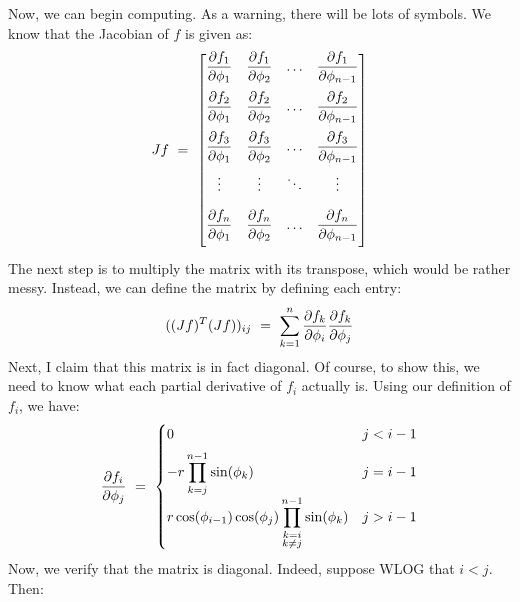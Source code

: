 Now, we can begin computing. As a warning, there will be lots of symbols.
We know that the Jacobian of $ f $ is given as:
\begin{equation*}
    Jf \ = \
    \begin{bmatrix}
        \dfrac{\partial f_{1}}{\partial \phi_{1}} & \dfrac{\partial f_{1}}{\partial \phi_{2}} & \dots &
        \dfrac{\partial f_{1}}{\partial \phi_{n-1}} \\[1.125em]
        \dfrac{\partial f_{2}}{\partial \phi_{1}} & \dfrac{\partial f_{2}}{\partial \phi_{2}} & \dots &
        \dfrac{\partial f_{2}}{\partial \phi_{n-1}} \\[1.125em]
        \dfrac{\partial f_{3}}{\partial \phi_{1}} & \dfrac{\partial f_{3}}{\partial \phi_{2}} & \dots &
        \dfrac{\partial f_{3}}{\partial \phi_{n-1}} \\[1em]
        \vdots & \vdots & \ddots & \vdots \\[1em]
        \dfrac{\partial f_{n}}{\partial \phi_{1}} & \dfrac{\partial f_{n}}{\partial \phi_{2}} & \dots &
        \dfrac{\partial f_{n}}{\partial \phi_{n-1}} \\[1.125em]
    \end{bmatrix}
\end{equation*}
The next step is to multiply the matrix with its transpose, which would be rather
messy. Instead, we can define the matrix by defining each entry:
\begin{equation*}
    ((Jf)^{T}(Jf))_{ij} \ = \ \sum_{k=1}^{n}\frac{\partial f_{k}}{\partial\phi_{i}}
    \frac{\partial f_{k}}{\partial\phi_{j}}
\end{equation*}
Next, I claim that this matrix is in fact diagonal. Of course, to show this, we
need to know what each partial derivative of $ f_{i} $ actually is. Using our
definition of $ f_{i} $, we have:
\begin{equation*}
    \frac{\p f_{i}}{\p\phi_{j}} \ = \
    \begin{cases}
        0 & j<i-1 \vsp
        -r\displaystyle\prod_{k=j}^{n-1}\sin(\phi_{k}) & j=i-1 \vsp
        r\cos(\phi_{i-1})\cos(\phi_{j})\displaystyle
        \prod_{\substack{k=i\\k\neq j}}^{n-1} \sin(\phi_{k}) & j>i-1
    \end{cases}
\end{equation*}
Now, we verify that the matrix is diagonal. Indeed, suppose WLOG that $ i < j $.
Then:
